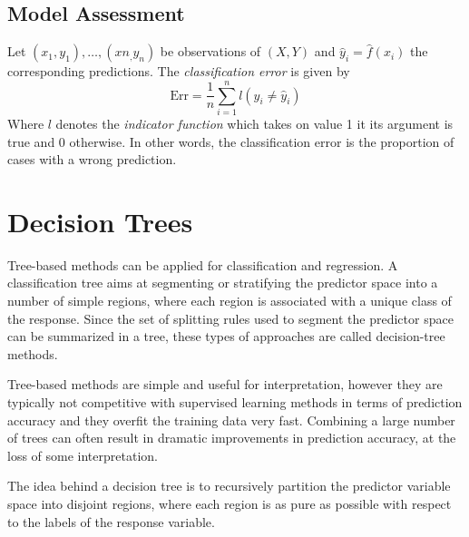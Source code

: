 \documentclass[11pt]{article}
\begin{document}
\subsection{Model Assessment}
\begin{definition}
	Let $(x_1, y_1),\dots,(x n_,y_n)$ be observations of $(X,Y)$ and $\hat{y}_i = \hat{f}(x_i)$ the corresponding predictions. The \emph{classification error} is given by
	\begin{equation*}
		\text{Err} = \frac{1}{n}\sum_{i=1}^{n} l(y_i \neq \hat{y}_i)
	\end{equation*}
	Where $l$ denotes the \emph{indicator function} which takes on value 1 it its argument is true and 0 otherwise. In other words, the classification error is the proportion of cases with a wrong prediction.
\end{definition}

\section{Decision Trees}
Tree-based methods can be applied for classification and regression. A classification tree aims at segmenting or stratifying the predictor space into a number of simple regions, where each region is associated with a unique class of the response. Since the set of splitting rules used to segment the predictor space can be summarized in a tree, these types of approaches are called decision-tree methods.

Tree-based methods are simple and useful for interpretation, however they are typically not competitive with supervised learning methods in terms of prediction accuracy and they overfit the training data very fast. Combining a large number of trees can often result in dramatic improvements in prediction accuracy, at the loss of some interpretation.

The idea behind a decision tree is to recursively partition the predictor variable space into disjoint regions, where each region is as pure as possible with respect to the labels of the response variable.
\end{document}
